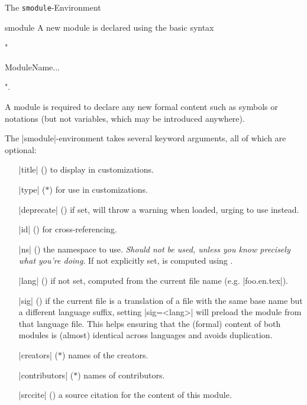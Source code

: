 \begin{sfragment}{The \texttt{smodule}-Environment}
    \begin{environment}{smodule}
        A new module is declared using the basic syntax
        \begin{center}
        \stexcode"\begin{smodule}[options]{ModuleName}...\end{smodule}".
        \end{center}
        A module is required to declare any new formal content such as symbols or
        notations (but not variables, which may be introduced anywhere).

        The |smodule|-environment takes several keyword arguments, all of which are
        optional:

        \begin{itemize}
            \item[|title|] () to display in customizations.
            \item[|type|] ($\ast$)  for use in customizations.
            \item[|deprecate|] () if set, will throw a warning
            when loaded, urging to use  instead.
            \item[|id|] () for cross-referencing.
            \item[|ns|] () the namespace to use. \emph{Should not be used,
            unless you know precisely what you're doing}. If not explicitly set, is
            computed using .
            \item[|lang|] () if not set, computed from the current file name (e.g. |foo.en.tex|).
            \item[|sig|] () if the current file is a translation of a file with the same base name
            but a different language suffix, setting |sig=<lang>| will preload the module
            from that language file. This helps ensuring that the (formal) content of both modules
            is (almost) identical across languages and avoids duplication.
            \item[|creators|] ($\ast$) names of the creators.
            \item[|contributors|] ($\ast$) names of contributors.
            \item[|srccite|] () a source citation for the content of this module.
        \end{itemize}
    \end{environment}


\end{sfragment}
